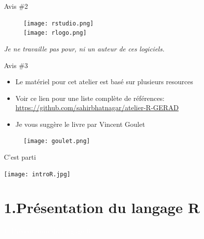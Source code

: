 \documentclass[11pt]{beamer}\usepackage[]{graphicx}\usepackage[]{color}
\begin{document}
\begin{frame}{Avis \#2}
\begin{figure}
\texttt{[image: rstudio.png]}\\[5mm]
\texttt{[image: rlogo.png]}\\[5mm]
\end{figure}

\textit{Je ne travaille pas pour, ni un auteur de ces logiciels.}

\end{frame}

\begin{frame}{Avis \#3}

\begin{itemize}
\item Le mat\'{e}riel pour cet atelier est bas\'{e} sur plusieurs resources
\item Voir ce lien pour une liste compl\`{e}te de r\'{e}f\'{e}rences: \href{https://github.com/sahirbhatnagar/atelier-R-GERAD}{https://github.com/sahirbhatnagar/atelier-R-GERAD}
\item Je vous sugg\`{e}re le livre par Vincent Goulet
\end{itemize}


\begin{figure}
\texttt{[image: goulet.png]}
\end{figure}


\end{frame}


\begin{frame}[plain]{C'est parti}
\hspace*{-1.5cm}\parbox[t]{\textwidth}{
\begin{center}
\texttt{[image: introR.jpg]}
\end{center}
}
\end{frame}



\section{1.Pr\'{e}sentation du langage R}

\begin{frame}[plain]
\hspace*{-1.0cm}\parbox[t]{\textwidth}{
 \begin{center}
  \Huge{\textcolor{white}{1. Pr\'{e}sentation du langage R}}
 \end{center}
 }
\end{frame}
\end{document}
